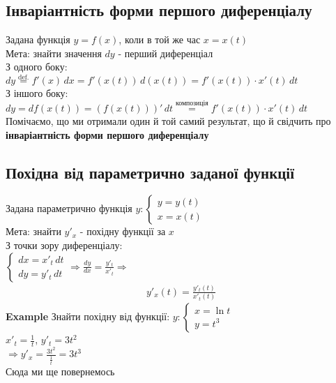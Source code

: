 \documentclass[a4paper, 14pt]{extarticle}
\def\huge{\displaystyle}
\def\bigline{\vspace{5mm}\\}
\def\ex#1{\textbf{Example {#1}}}
\def\bigline{\vspace{5mm}\\}
\begin{document}
\subsection{Інваріантність форми першого диференціалу}
Задана функція $y = f(x)$, коли в той же час $x = x(t)$\\
Мета: знайти значення $dy$ - перший диференціал\\
З одного боку:\\
$dy \overset{\textrm{def.}}{=} f'(x)\,dx = f'(x(t))\,d(x(t)) = f'(x(t))\cdot x'(t)\,dt$\\
З іншого боку:\\
$dy = df(x(t)) = (f(x(t)))'\,dt \overset{\textrm{композиція}}{=} f'(x(t))\cdot x'(t)\,dt$\\
Помічаємо, що ми отримали один й той самий результат, що й свідчить про \textbf{інваріантність форми першого диференціалу}
\bigline
\subsection{Похідна від параметрично заданої функції}
Задана параметрично функція $y: \begin{cases} y = y(t) \\ x = x(t) \end{cases}$\\
Мета: знайти $y'_x$ - похідну функції за $x$\\
З точки зору диференціалу:\\
$\begin{cases} dx = x'_t\,dt \\ dy = y'_t\,dt \end{cases} \Rightarrow \huge \frac{dy}{dx} = \frac{y'_t}{x'_t} \Rightarrow$
\begin{align*}
y'_x(t) = \frac{y'_t(t)}{x'_t(t)}
\end{align*}
\ex{} Знайти похідну від функції: $y: \begin{cases} x = \ln t \\ y = t^3 \end{cases}$\\
$x'_t = \huge \frac{1}{t}$,    $y'_t = 3t^2$\\
$\Rightarrow y'_x = \huge \frac{3t^2}{\frac{1}{t}} = 3t^3$\\
Сюда ми ще повернемось \bigline
\end{document}
